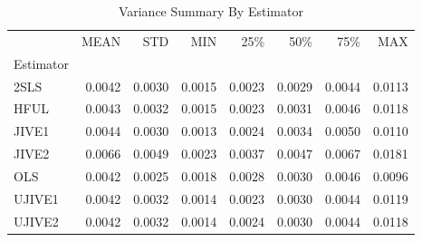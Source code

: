 \begin{table}[ht]
\centering
\caption{Variance Summary By Estimator}
\begin{tabular}{lrrrrrrr}
\toprule
 & MEAN & STD & MIN & 25\% & 50\% & 75\% & MAX \\
Estimator &  &  &  &  &  &  &  \\
\midrule
2SLS & 0.0042 & 0.0030 & 0.0015 & 0.0023 & 0.0029 & 0.0044 & 0.0113 \\
HFUL & 0.0043 & 0.0032 & 0.0015 & 0.0023 & 0.0031 & 0.0046 & 0.0118 \\
JIVE1 & 0.0044 & 0.0030 & 0.0013 & 0.0024 & 0.0034 & 0.0050 & 0.0110 \\
JIVE2 & 0.0066 & 0.0049 & 0.0023 & 0.0037 & 0.0047 & 0.0067 & 0.0181 \\
OLS & 0.0042 & 0.0025 & 0.0018 & 0.0028 & 0.0030 & 0.0046 & 0.0096 \\
UJIVE1 & 0.0042 & 0.0032 & 0.0014 & 0.0023 & 0.0030 & 0.0044 & 0.0119 \\
UJIVE2 & 0.0042 & 0.0032 & 0.0014 & 0.0024 & 0.0030 & 0.0044 & 0.0118 \\
\bottomrule
\end{tabular}
\end{table}
